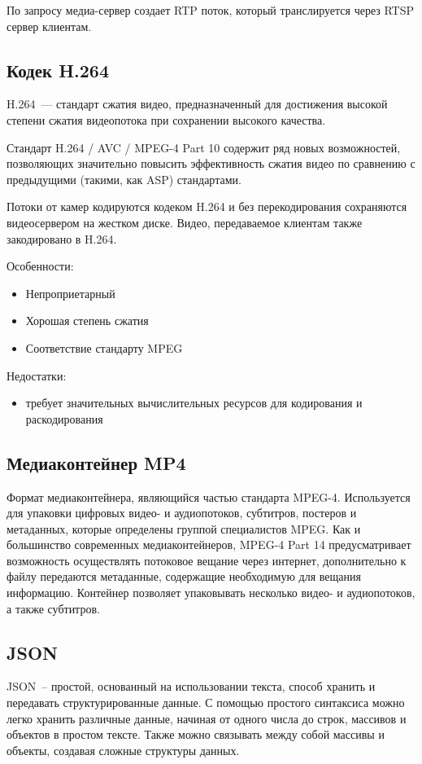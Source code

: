 По запросу медиа-сервер создает RTP поток, который транслируется через RTSP сервер клиентам.

\subsection{Кодек H.264}
H.264~--- стандарт сжатия видео, предназначенный для достижения высокой степени сжатия видеопотока
при сохранении высокого качества.

Стандарт H.264 / AVC / MPEG-4 Part 10 содержит ряд новых возможностей, позволяющих значительно
повысить эффективность сжатия видео по сравнению с предыдущими (такими, как ASP) стандартами.

Потоки от камер кодируются кодеком H.264 и без перекодирования сохраняются видеосервером на
жестком диске. Видео, передаваемое клиентам также закодировано в H.264.

\medskip

Особенности:
\smallskip
\begin{itemize}
	\item Непроприетарный
	\item Хорошая степень сжатия
	\item Соответствие стандарту MPEG
\end{itemize}

\medskip

Недостатки:
\smallskip
\begin{itemize}
	\item требует значительных вычислительных ресурсов для кодирования и раскодирования
\end{itemize}

\subsection{Медиаконтейнер MP4}
Формат медиаконтейнера, являющийся частью стандарта MPEG-4.
Используется для упаковки цифровых видео- и аудиопотоков, субтитров, постеров и метаданных,
которые определены группой специалистов MPEG.
Как и большинство современных медиаконтейнеров, MPEG-4 Part 14 предусматривает возможность
осуществлять потоковое вещание через интернет, дополнительно к файлу передаются метаданные,
содержащие необходимую для вещания информацию.
Контейнер позволяет упаковывать несколько видео- и аудиопотоков, а также субтитров.

\subsection{JSON}
JSON~-- простой, основанный на использовании текста, способ хранить и передавать структурированные
данные. С помощью простого синтаксиса  можно легко хранить различные данные, начиная от одного числа
до строк, массивов и объектов в простом тексте. Также можно связывать между собой массивы и объекты,
создавая сложные структуры данных.

